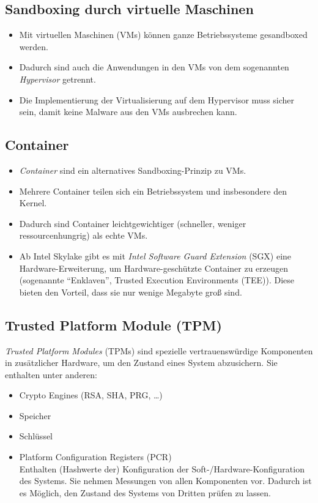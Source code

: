 \documentclass[a4paper, 11pt, accentcolor = tud3b]{tudreport}
\begin{document}
            \subsection{Sandboxing durch virtuelle Maschinen}
                \begin{itemize}
                	\item Mit virtuellen Maschinen (VMs) können ganze Betriebssysteme gesandboxed werden.
                	\item Dadurch sind auch die Anwendungen in den VMs von dem sogenannten \textit{Hypervisor} getrennt.
                	\item Die Implementierung der Virtualisierung auf dem Hypervisor muss sicher sein, damit keine Malware aus den VMs ausbrechen kann.
                \end{itemize}

            \subsection{Container}
                \begin{itemize}
                	\item \textit{Container} sind ein alternatives Sandboxing-Prinzip zu VMs.
                	\item Mehrere Container teilen sich ein Betriebssystem und insbesondere den Kernel.
                	\item Dadurch sind Container leichtgewichtiger (schneller, weniger ressourcenhungrig) als echte VMs.
                	\item Ab Intel Skylake gibt es mit \textit{Intel Software Guard Extension} (SGX) eine Hardware-Erweiterung, um Hardware-geschützte Container zu erzeugen (sogenannte \enquote{Enklaven}, Trusted Execution Environments (TEE)). Diese bieten den Vorteil, dass sie nur wenige Megabyte groß sind.
                \end{itemize}

            \subsection{Trusted Platform Module (TPM)}
                \textit{Trusted Platform Modules} (TPMs) sind spezielle vertrauenswürdige Komponenten in zusätzlicher Hardware, um den Zustand eines System abzusichern. Sie enthalten unter anderen:
               	\begin{itemize}
               		\item Crypto Engines (RSA, SHA, PRG, \dots)
               		\item Speicher
               		\item Schlüssel
               		\item Platform Configuration Registers (PCR) \\ Enthalten (Hashwerte der) Konfiguration der Soft-/Hardware-Konfiguration des Systems. Sie nehmen Messungen von allen Komponenten vor. Dadurch ist es Möglich, den Zustand des Systems von Dritten prüfen zu lassen.
               	\end{itemize}
               
\end{document}
